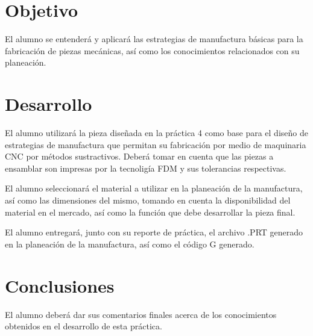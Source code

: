 
\section{Objetivo}

	El alumno se entenderá y aplicará las estrategias de manufactura básicas para la fabricación de piezas mecánicas, así como los conocimientos relacionados con su planeación.


\section{Desarrollo}

	El alumno utilizará la pieza diseñada en la práctica 4 como base para el diseño de estrategias de manufactura que permitan su fabricación por medio de maquinaria CNC por métodos sustractivos. Deberá tomar en cuenta que las piezas a ensamblar son impresas por la tecnoligía FDM y sus tolerancias respectivas.

	El alumno seleccionará el material a utilizar en la planeación de la manufactura, así como las dimensiones del mismo, tomando en cuenta la disponibilidad del material en el mercado, así como la función que debe desarrollar la pieza final.

	El alumno entregará, junto con su reporte de práctica, el archivo .PRT generado en la planeación de la manufactura, así como el código G generado.


\section{Conclusiones}

	El alumno deberá dar sus comentarios finales acerca de los conocimientos obtenidos en el desarrollo de esta práctica.


